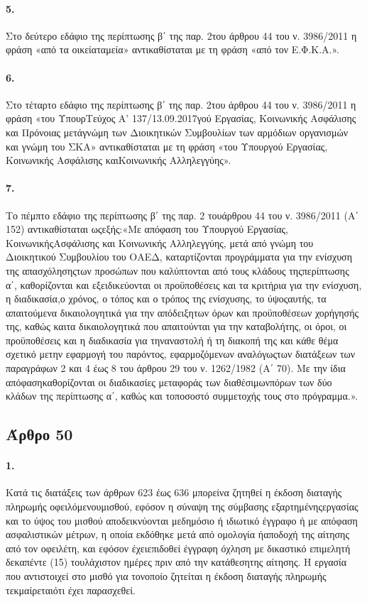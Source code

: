 \documentclass[a4paper,oneside, 10pt]{book}
\begin{document}
\paragraph { 5. } Στο δεύτερο εδάφιο της περίπτωσης β΄ της παρ. 2του άρθρου 44 του ν. 3986/2011 η φράση «από τα οικείαταμεία» αντικαθίσταται με τη φράση «από τον Ε.Φ.Κ.Α.».
\paragraph { 6. } Στο τέταρτο εδάφιο της περίπτωσης β΄ της παρ. 2του άρθρου 44 του ν. 3986/2011 η φράση «του ΥπουρΤεύχος Α’ 137/13.09.2017γού Εργασίας, Κοινωνικής Ασφάλισης και Πρόνοιας μετάγνώμη των Διοικητικών Συμβουλίων των αρμόδιων οργανισμών και γνώμη του ΣΚΑ» αντικαθίσταται με τη φράση «του Υπουργού Εργασίας, Κοινωνικής Ασφάλισης καιΚοινωνικής Αλληλεγγύης».
\paragraph { 7. } Το πέμπτο εδάφιο της περίπτωσης β΄ της παρ. 2 τουάρθρου 44 του ν. 3986/2011 (Α΄ 152) αντικαθίσταται ωςεξής:«Με απόφαση του Υπουργού Εργασίας, ΚοινωνικήςΑσφάλισης και Κοινωνικής Αλληλεγγύης, μετά από γνώμη του Διοικητικού Συμβουλίου του ΟΑΕΔ, καταρτίζονται προγράμματα για την ενίσχυση της απασχόλησηςτων προσώπων που καλύπτονται από τους κλάδους τηςπερίπτωσης α΄, καθορίζονται και εξειδικεύονται οι προϋποθέσεις και τα κριτήρια για την ενίσχυση, η διαδικασία,ο χρόνος, ο τόπος και ο τρόπος της ενίσχυσης, το ύψοςαυτής, τα απαιτούμενα δικαιολογητικά για την απόδειξητων όρων και προϋποθέσεων χορήγησής της, καθώς καιτα δικαιολογητικά που απαιτούνται για την καταβολήτης, οι όροι, οι προϋποθέσεις και η διαδικασία για τηναναστολή ή τη διακοπή της και κάθε θέμα σχετικό μετην εφαρμογή του παρόντος, εφαρμοζόμενων αναλόγωςτων διατάξεων των παραγράφων 2 και 4 έως 8 του άρθρου 29 του ν. 1262/1982 (Α΄ 70). Με την ίδια απόφασηκαθορίζονται οι διαδικασίες μεταφοράς των διαθέσιμωνπόρων των δύο κλάδων της περίπτωσης α΄, καθώς και τοποσοστό συμμετοχής τους στο πρόγραμμα.».
\subsection*{ Άρθρο 50 }
\paragraph { 1. } Κατά τις διατάξεις των άρθρων 623 έως 636 μπορείνα ζητηθεί η έκδοση διαταγής πληρωμής οφειλόμενουμισθού, εφόσον η σύναψη της σύμβασης εξαρτημένηςεργασίας και το ύψος του μισθού αποδεικνύονται μεδημόσιο ή ιδιωτικό έγγραφο ή με απόφαση ασφαλιστικών μέτρων, η οποία εκδόθηκε μετά από ομολογία ήαποδοχή της αίτησης από τον οφειλέτη, και εφόσον έχειεπιδοθεί έγγραφη όχληση με δικαστικό επιμελητή δεκαπέντε (15) τουλάχιστον ημέρες πριν από την κατάθεσητης αίτησης. Η εργασία που αντιστοιχεί στο μισθό για τονοποίο ζητείται η έκδοση διαταγής πληρωμής τεκμαίρεταιότι έχει παρασχεθεί.
\end{document}
